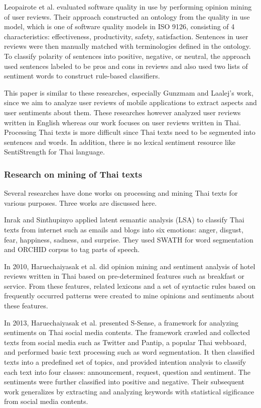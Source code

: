 Leopairote et al. \cite{leopairote2} evaluated software quality in use by performing opinion mining of user reviews. Their approach constructed an ontology from the quality in use model, which is one of software quality models in ISO 9126, consisting of 4 characteristics: effectiveness, productivity, safety, satisfaction. Sentences in user reviews were then manually matched with terminologies defined in the ontology. To classify polarity of sentences into positive, negative, or neutral, the approach used sentences labeled to be pros and cons in reviews and also used two lists of sentiment words to construct rule-based classifiers.

This paper is similar to these researches, especially Gunzmam and Laalej's work, since we aim to analyze user reviews of mobile applications to extract aspects and user sentiments about them. These researches however analyzed user reviews written in English whereas our work focuses on user reviews written in Thai. Processing Thai texts is more difficult since Thai texts need to be segmented into sentences and words. In addition, there is no lexical sentiment resource like SentiStrength for Thai language. 

\subsubsection{Research on mining of Thai texts} Several researches have done works on processing and mining Thai texts for various purposes. Three works are discussed here.

Inrak and Sinthupinyo \cite{emotioninthai} applied latent semantic analysis (LSA) \cite{LSA} to classify Thai texts from internet such as emails and blogs into six emotions: anger, disgust, fear, happiness, sadness, and surprise. They used SWATH \cite{SWATH} for word segmentation and ORCHID \cite{ORCHID} corpus to tag parts of speech.

In 2010, Haruechaiyasak et al. \cite{thaiopinionmininghotel} did opinion mining and sentiment analysis of hotel reviews written in Thai based on pre-determined features such as breakfast or service. From these features, related lexicons and a set of syntactic rules based on frequently occurred patterns were created to mine opinions and sentiments about these features.

In 2013, Haruechaiyasak et al. \cite{ssense} presented S-Sense, a framework for analyzing sentiments on Thai social media contents. The framework crawled and collected texts from social media such as Twitter and Pantip, a popular Thai webboard, and performed basic text processing such as word segmentation. It then classified texts into a predefined set of topics, and provided intention analysis to classify each text into four classes: announcement, request, question and sentiment. The sentiments were further classified into positive and negative. Their subsequent work \cite{ssense2} generalizes by extracting and analyzing keywords with statistical sigificance from social media contents.

